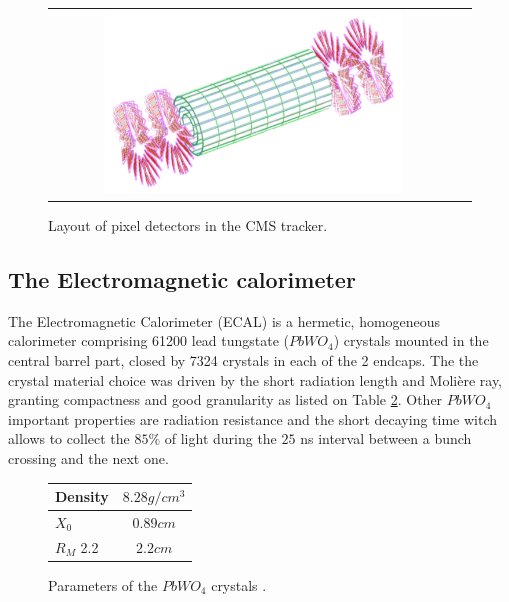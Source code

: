 \begin{figure}[tbh!]
	\centering
	\begin{tabular}{cc}
		\includegraphics[width=0.75\textwidth]{detector/pics/Pixel_layout.pdf}
	\end{tabular}
	\caption{Layout of pixel detectors in the CMS tracker.}
	\label{fig:Pixel_layout}
\end{figure}

\subsection{The Electromagnetic calorimeter}

The Electromagnetic Calorimeter (ECAL) is a hermetic, homogeneous calorimeter comprising 61200 lead tungstate ($PbWO_{4}$) crystals mounted in the central barrel part, closed by 7324 crystals in each of the 2 endcaps.
The the crystal material choice was driven by the short radiation length and Molière ray, granting compactness and good granularity as listed on Table \ref{table:CMS_PbWO4}. Other $PbWO_{4}$ important properties are radiation resistance and the short decaying time witch allows to collect the $85\%$ of light during the $25$ ns interval between a bunch crossing and the next one.

\begin{figure}[tbh!]
	\begin{center}
		
		\begin{tabular}{ | l | c |}
			\hline
			Density  & $ 8.28 g/cm^{3}$ \\ \hline
			$X_{0}$   & $0.89 cm$  \\ \hline
			$R_{M}$ 2.2 & $2.2 cm$  \\ \hline
			\hline
		\end{tabular}
		\caption{Parameters of the $PbWO_{4}$ crystals .}
		\label{table:CMS_PbWO4}
	\end{center}
\end{figure}

